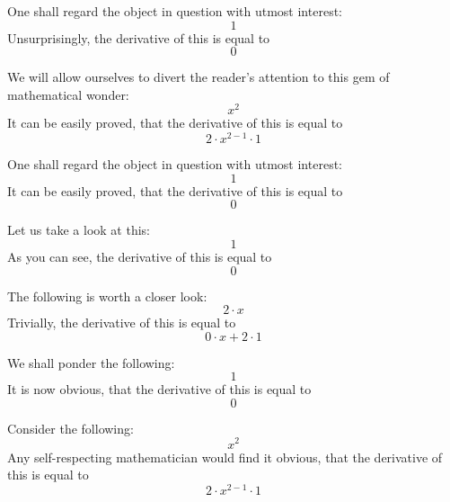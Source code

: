 \documentclass{article}
\begin{document}
One shall regard the object in question with utmost interest:
\begin{equation}
1 
\end{equation}
Unsurprisingly, the derivative of this is equal to
\begin{equation}
0 
\end{equation}

We will allow ourselves to divert the reader's attention to this gem of mathematical wonder:
\begin{equation}
x ^{2 } 
\end{equation}
It can be easily proved, that the derivative of this is equal to
\begin{equation}
2 \cdot x ^{2 - 1 } \cdot 1 
\end{equation}

One shall regard the object in question with utmost interest:
\begin{equation}
1 
\end{equation}
It can be easily proved, that the derivative of this is equal to
\begin{equation}
0 
\end{equation}

Let us take a look at this:
\begin{equation}
1 
\end{equation}
As you can see, the derivative of this is equal to
\begin{equation}
0 
\end{equation}

The following is worth a closer look:
\begin{equation}
2 \cdot x 
\end{equation}
Trivially, the derivative of this is equal to
\begin{equation}
0 \cdot x + 2 \cdot 1 
\end{equation}

We shall ponder the following:
\begin{equation}
1 
\end{equation}
It is now obvious, that the derivative of this is equal to
\begin{equation}
0 
\end{equation}

Consider the following:
\begin{equation}
x ^{2 } 
\end{equation}
Any self-respecting mathematician would find it obvious, that the derivative of this is equal to
\begin{equation}
2 \cdot x ^{2 - 1 } \cdot 1 
\end{equation}
\end{document}
